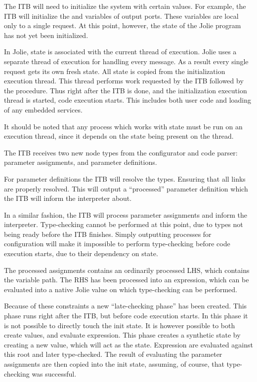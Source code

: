 
The ITB will need to initialize the system with certain values. For example,
the ITB will initialize the  and  variables
of output ports. These variables are local only to a single request. At this
point, however, the state of the Jolie program has not yet been initialized.

In Jolie, state is associated with the current thread of execution. Jolie uses
a separate thread of execution for handling every message. As a result every
single request gets its own fresh state. All state is copied from the
initialization execution thread. This thread performs work requested by the ITB
followed by the  procedure. Thus right after the ITB is done, and
the initialization execution thread is started, code execution starts. This
includes both user code and loading of any embedded services.

It should be noted that any process which works with state must be run on an
execution thread, since it depends on the state being present on the thread.


The ITB receives two new node types from the configurator and code parser:
parameter assignments, and parameter definitions.

For parameter definitions the ITB will resolve the types. Ensuring that all
links are properly resolved. This will output a ``processed'' parameter
definition which the ITB will inform the interpreter about.

In a similar fashion, the ITB will process parameter assignments and inform the
interpreter. Type-checking cannot be performed at this point, due to types not
being ready before the ITB finishes. Simply outputting processes for
configuration will make it impossible to perform type-checking before code
execution starts, due to their dependency on state.

The processed assignments contains an ordinarily processed LHS, which contains
the variable path. The RHS has been processed into an expression, which can be
evaluated into a native Jolie value on which type-checking can be performed.


Because of these constraints a new ``late-checking phase'' has been created.
This phase runs right after the ITB, but before code execution starts. In this
phase it is not possible to directly touch the init state. It is however
possible to both create values, and evaluate expression. This phase creates a
synthetic state by creating a new value, which will act as the state.
Expression are evaluated against this root and later type-checked. The result
of evaluating the parameter assignments are then copied into the init state,
   assuming, of course, that type-checking was successful.

